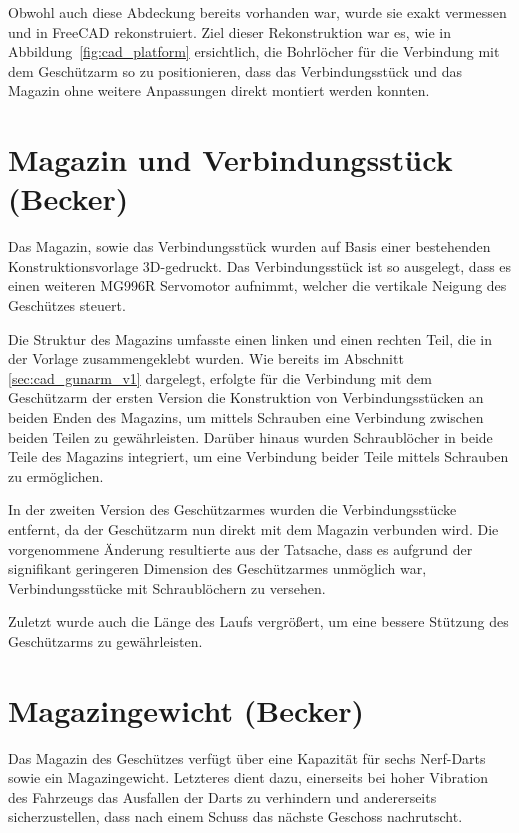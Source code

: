 Obwohl auch diese Abdeckung bereits vorhanden war, wurde sie
exakt vermessen und in FreeCAD rekonstruiert. Ziel dieser
Rekonstruktion war es, wie in Abbildung~\ref{fig:cad_platform} ersichtlich, die Bohrlöcher für die Verbindung mit dem
Geschützarm so zu positionieren, dass das Verbindungsstück und das
Magazin ohne weitere Anpassungen direkt montiert werden konnten.

\section{Magazin und Verbindungsstück (Becker)}

Das Magazin, sowie das Verbindungsstück wurden auf Basis einer bestehenden Konstruktionsvorlage \cite{cad_turret_blueprint} 3D-gedruckt. 
Das Verbindungsstück ist so ausgelegt, dass es einen weiteren MG996R Servomotor aufnimmt, welcher die vertikale Neigung des Geschützes
steuert.

Die Struktur des Magazins umfasste einen linken und einen rechten Teil, die in der Vorlage zusammengeklebt wurden.
Wie bereits im Abschnitt \ref{sec:cad_gunarm_v1} dargelegt, erfolgte für die Verbindung mit dem Geschützarm der ersten Version die Konstruktion von Verbindungsstücken an beiden Enden des Magazins, 
um mittels Schrauben eine Verbindung zwischen beiden Teilen zu gewährleisten.  Darüber hinaus wurden Schraublöcher in beide Teile des Magazins integriert, 
um eine Verbindung beider Teile mittels Schrauben zu ermöglichen.

In der zweiten Version des Geschützarmes wurden die Verbindungsstücke entfernt, da der Geschützarm nun direkt mit dem Magazin verbunden wird.
Die vorgenommene Änderung resultierte aus der Tatsache, dass es aufgrund der signifikant geringeren Dimension des Geschützarmes unmöglich war, Verbindungsstücke mit Schraublöchern zu versehen.

Zuletzt wurde auch die Länge des Laufs vergrößert, um eine bessere Stützung des Geschützarms zu gewährleisten.

\section{Magazingewicht (Becker)}

Das Magazin des Geschützes verfügt über eine Kapazität für sechs Nerf-Darts sowie ein Magazingewicht. 
Letzteres dient dazu, einerseits bei hoher Vibration des Fahrzeugs das Ausfallen der Darts zu verhindern und andererseits sicherzustellen, dass nach einem Schuss das nächste Geschoss nachrutscht.

